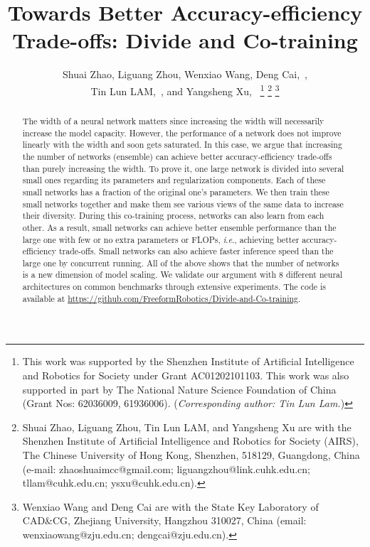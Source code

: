 \documentclass[lettersize,journal]{IEEEtran}
\newcommand{\ie}{\textit{i}.\textit{e}.}
\begin{document}
\title{Towards Better Accuracy-efficiency Trade-offs: Divide and Co-training}

\author{Shuai Zhao, Liguang Zhou, Wenxiao Wang, Deng Cai,~, \\
	Tin Lun LAM,~,
	and Yangsheng Xu,~
\thanks{
This work was supported by the Shenzhen Institute of Artificial Intelligence and  Robotics for Society under Grant AC01202101103.
This work was also supported in part by The National
Nature Science Foundation of China (Grant Nos: 62036009, 61936006).
(\emph{Corresponding author: Tin Lun Lam.})}
\thanks{Shuai Zhao, Liguang Zhou, Tin Lun LAM, and Yangsheng Xu
	are with the Shenzhen Institute of Artificial Intelligence and
	Robotics for Society (AIRS), The Chinese University of Hong Kong, Shenzhen,
	518129, Guangdong, China (e-mail: zhaoshuaimcc@gmail.com;
	liguangzhou@link.cuhk.edu.cn; tllam@cuhk.edu.cn; ysxu@cuhk.edu.cn).}
\thanks{Wenxiao Wang and Deng Cai are with the State Key Laboratory of CAD\&CG, Zhejiang
	University, Hangzhou 310027, China (email: wenxiaowang@zju.edu.cn; dengcai@zju.edu.cn).}
}


\maketitle

\begin{abstract}
The width of a neural network matters since increasing the width
will necessarily increase the model capacity.
However, the performance of a network does not improve linearly
with the width and soon gets saturated.
In this case, we argue that increasing the number of networks (ensemble)
can achieve better accuracy-efficiency trade-offs than purely increasing the width.
To prove it,
one large network is divided into several small ones
regarding its parameters and regularization components.
Each of these small networks has a fraction of the original one's parameters.
We then train these small networks together and make them see various 
views of the same data to increase their diversity.
During this co-training process,
networks can also learn from each other.
As a result, small networks can achieve better ensemble performance
than the large one with few or no extra parameters or FLOPs, \ie,
achieving better accuracy-efficiency trade-offs.
Small networks can also achieve faster inference speed
than the large one by concurrent running.
All of the above shows that the number of networks is a new dimension of model scaling.
We validate our argument with 8 different neural architectures on
common benchmarks through extensive experiments.
The code is available at \url{https://github.com/FreeformRobotics/Divide-and-Co-training}.
\end{abstract}
\end{document}
